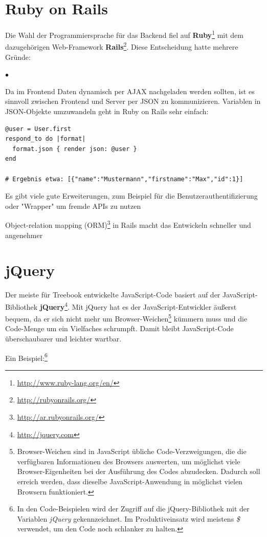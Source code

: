 \documentclass[10pt,a4paper]{book}
\begin{document}
\section{Ruby on Rails}
Die Wahl der Programmiersprache für das Backend fiel auf \textbf{Ruby}\footnote{\href{http://www.ruby-lang.org/en/}{http://www.ruby-lang.org/en/}} mit dem dazugehörigen Web-Framework \textbf{Rails}\footnote{\href{http://rubyonrails.org/}{http://rubyonrails.org/}}. Diese Entscheidung hatte mehrere Gründe:
\lstset{language=Ruby}
\begin{list}{$\bullet$}{}
\item Da im Frontend Daten dynamisch per AJAX nachgeladen werden sollten, ist es sinnvoll zwischen Frontend und Server per JSON zu kommunizieren. Variablen in JSON-Objekte umzuwandeln geht in Ruby on Rails sehr einfach:
\begin{lstlisting}
@user = User.first
respond_to do |format|
  format.json { render json: @user }
end

# Ergebnis etwa: [{"name":"Mustermann","firstname":"Max","id":1}]
\end{lstlisting}
\item Es gibt viele gute Erweiterungen, zum Beispiel für die Benutzerauthentifizierung oder "Wrapper" um fremde APIs zu nutzen
\item Object-relation mapping (ORM)\footnote{\href{http://ar.rubyonrails.org/}{http://ar.rubyonrails.org/}} in Rails macht das Entwickeln schneller und angenehmer
\end{list}

\section{jQuery}
Der meiste für Treebook entwickelte JavaScript-Code basiert auf der JavaScript-Bibliothek \textbf{jQuery}\footnote{\href{http://jquery.com}{http://jquery.com}}. Mit jQuery hat es der JavaScript-Entwickler äußerst bequem, da er sich nicht mehr um Browser-Weichen\footnote{Browser-Weichen sind in JavaScript übliche Code-Verzweigungen, die die verfügbaren Informationen des Browsers auswerten, um möglichst viele Browser-Eigenheiten bei der Ausführung des Codes abzudecken. Dadurch soll erreich werden, dass dieselbe JavaScript-Anwendung in möglichst vielen Browsern funktioniert.} kümmern muss und die Code-Menge um ein Vielfaches schrumpft. Damit bleibt JavaScript-Code überschaubarer und leichter wartbar.

Ein Beispiel:\footnote{In den Code-Beispielen wird der Zugriff auf die jQuery-Bibliothek mit der Variablen \textit{jQuery} gekennzeichnet. Im Produktiveinsatz wird meistens \textit{\$} verwendet, um den Code noch schlanker zu halten.}
\end{document}
